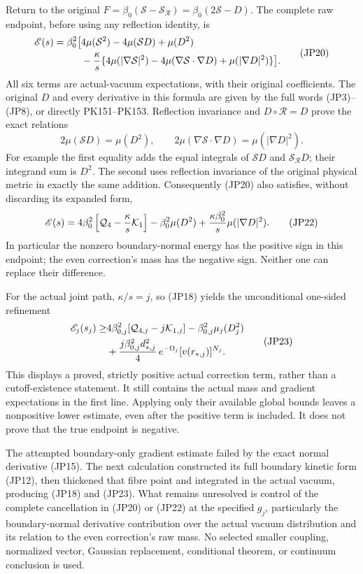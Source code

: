 \documentclass[11pt]{article}
\begin{document}
Return to the original \(F=\beta_0(\mathcal S-\mathcal S_{\mathcal R})
=\beta_0(2\mathcal S-D)\). The complete raw endpoint, before using
any reflection identity, is
\[
\begin{aligned}
\mathscr E(s)
=\beta_0^2\big[&4\mu(\mathcal S^2)-4\mu(\mathcal SD)+\mu(D^2)\\
 &-{\kappa\over s}\{
 4\mu(|\nabla\mathcal S|^2)
 -4\mu(\nabla\mathcal S\cdot\nabla D)
 +\mu(|\nabla D|^2)\}\big].
\end{aligned}\tag{JP20}
\]
All six terms are actual-vacuum expectations, with their original
coefficients. The original \(D\) and every derivative in this formula
are given by the full words (JP3)–(JP8), or directly PK151–PK153.
Reflection invariance and \(D\circ\mathcal R=D\) prove the exact
relations
\[
 2\mu(\mathcal SD)=\mu(D^2),\qquad
 2\mu(\nabla\mathcal S\cdot\nabla D)=\mu(|\nabla D|^2).
\tag{JP21}
\]
For example the first equality adds the equal integrals of
\(\mathcal SD\) and \(\mathcal S_{\mathcal R}D\); their integrand sum
is \(D^2\). The second uses reflection invariance of the original
physical metric in exactly the same addition. Consequently (JP20) also
satisfies, without discarding its expanded form,
\[
\mathscr E(s)=4\beta_0^2
 \left[\mathcal Q_4-{\kappa\over s}\mathcal K_1\right]
 -\beta_0^2\mu(D^2)
 +{\kappa\beta_0^2\over s}\mu(|\nabla D|^2).
\tag{JP22}
\]
In particular the nonzero boundary-normal energy has the positive sign
in this endpoint; the even correction's mass has the negative sign.
Neither one can replace their difference.

For the actual joint path, \(\kappa/s=j\), so (JP18) yields the
unconditional one-sided refinement
\[
\begin{aligned}
\mathscr E_j(s_j)\ge
&4\beta_{0,j}^2[\mathcal Q_{4,j}-j\mathcal K_{1,j}]
  -\beta_{0,j}^2\mu_j(D_j^2)\\
&+{j\beta_{0,j}^2d_{*,j}^2\over4}\,
                    e^{-\Omega_j}[v(r_{*,j})]^{N_j}.
\end{aligned}\tag{JP23}
\]
This displays a proved, strictly positive actual correction term, rather
than a cutoff-existence statement. It still contains the actual mass and
gradient expectations in the first line. Applying only their available
global bounds leaves a nonpositive lower estimate, even after the positive
term is included. It does not prove that the true endpoint is negative.

The attempted boundary-only gradient estimate failed by the exact normal
derivative (JP15). The next calculation constructed its full boundary
kinetic form (JP12), then thickened that fibre point and integrated in the
actual vacuum, producing (JP18) and (JP23). What remains unresolved is
control of the complete cancellation in (JP20) or (JP22) at the specified
\(g_j\), particularly the boundary-normal derivative contribution over
the actual vacuum distribution and its relation to the even correction's
raw mass. No selected smaller coupling, normalized vector, Gaussian
replacement, conditional theorem, or continuum conclusion is used.
\end{document}
